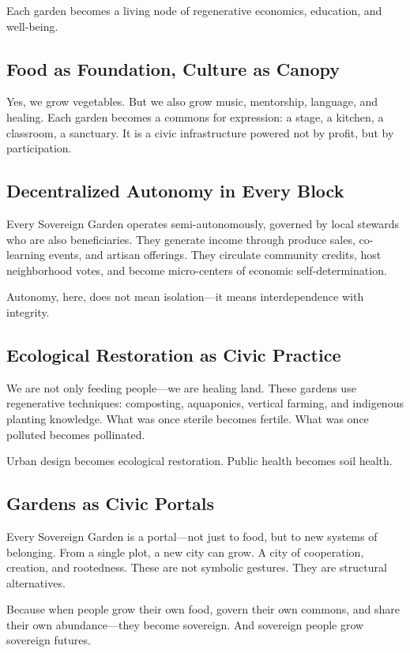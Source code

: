 \documentclass[12pt]{article}
\begin{document}
Each garden becomes a living node of regenerative economics, education, and well-being.

\subsection{Food as Foundation, Culture as Canopy}

Yes, we grow vegetables. But we also grow music, mentorship, language, and healing. Each garden becomes a commons for expression: a stage, a kitchen, a classroom, a sanctuary. It is a civic infrastructure powered not by profit, but by participation.

\subsection{Decentralized Autonomy in Every Block}

Every Sovereign Garden operates semi-autonomously, governed by local stewards who are also beneficiaries. They generate income through produce sales, co-learning events, and artisan offerings. They circulate community credits, host neighborhood votes, and become micro-centers of economic self-determination.

Autonomy, here, does not mean isolation—it means interdependence with integrity.

\subsection{Ecological Restoration as Civic Practice}

We are not only feeding people—we are healing land. These gardens use regenerative techniques: composting, aquaponics, vertical farming, and indigenous planting knowledge. What was once sterile becomes fertile. What was once polluted becomes pollinated.

Urban design becomes ecological restoration. Public health becomes soil health.

\subsection{Gardens as Civic Portals}

Every Sovereign Garden is a portal—not just to food, but to new systems of belonging. From a single plot, a new city can grow. A city of cooperation, creation, and rootedness. These are not symbolic gestures. They are structural alternatives.

Because when people grow their own food, govern their own commons, and share their own abundance—they become sovereign. And sovereign people grow sovereign futures.
\end{document}
